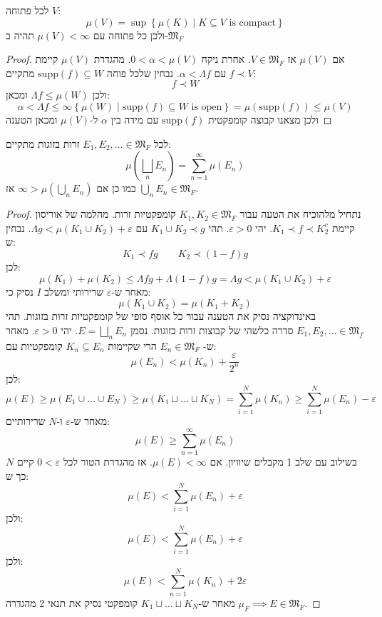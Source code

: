 \documentclass{tstextbook}
\begin{document}
\begin{lemma}[שלב 3]
לכל פתוחה \(V\):
$$\mu(V)=\sup \left\{  \mu(K) \mid K \subseteq V \text{ is compact}  \right\}$$
ולכן כל פתוחה עם \(\mu(V)< \infty\) תהיה ב-\(\mathfrak{M}_{F}\)

\end{lemma}
\begin{proof}
אם \(\mu(V)\) אז \(V \in \mathfrak{M}_{F}\). אחרת ניקח \(0<\alpha< \mu(V)\). מהגדרת \(\mu(V)\) קיימת \(f\prec V\) עם \(\alpha < \Lambda f\). נבחין שלכל פוחה \(\text{supp}(f)\subseteq W\) מתקיים:
$$f\prec W$$
ולכן \(\Lambda f\leq \mu(W)\) ומכאן:
$$\alpha< \Lambda f \leq \infty \left\{  \mu(W)\mid \text{supp}(f) \subseteq W \text{ is open}  \right\}=\mu\left( \text{supp}(f) \right)\leq \mu(V)$$
ולכן מצאנו קבוצה קומפקטית \(\text{supp}(f)\) עם מידה בין \(\alpha\) ל-\(\mu(V)\) ומכאן הטענה

\end{proof}
\begin{lemma}[שלב 4]
לכל \(E_{1}, E_{2}, \dots \in \mathfrak{M}_{F}\) זרות בזוגות מתקיים:
$$\mu\left( \bigsqcup_{n} E_{n} \right)=\sum_{n=1}^{\infty} \mu(E_{n})$$
כמו כן אם \(\infty> \mu\left( \bigcup_{n}E_{n} \right)\) אז \(\bigcup_{n}E_{n}\in \mathfrak{M}_{F}\).

\end{lemma}
\begin{proof}
נתחיל מלהוכיח את הטעה עבור \(K_{1},K_{2} \in \mathfrak{ M}_{F}\) קומפקטיות זרות. מהלמה של אוריסון קיימת \(K_{1}\prec f\prec K_{2}^{c}\). יהי \(\varepsilon> 0\). תהי \(K_{1}\cup K_{2}\prec g\) עם \(\Lambda g <\mu\left( K_{1}\cup K_{2} \right)+\varepsilon\). נבחין ש:
$$K_{1}\prec fg \qquad  K_{2}\prec (1-f)g$$
לכן:
$$\mu(K_{1})+\mu(K_{2})\leq \Lambda fg + \Lambda(1-f)g = \Lambda g <\mu\left( K_{1} \cup K_{2} \right)+\varepsilon$$
מאחר ש-\(\varepsilon\) שרירותי ומשלב \(I\) נסיק כי:
$$\mu\left( K_{1} \cup K_{2} \right)= \mu(K_{1}+K_{2})$$
באינדוקציה נסיק את הטענה עבור כל אוסף סופי של קומפקטיות זרות בזוגות. תהי \(E_{1},E_{2},\dots \in \mathfrak{M}_{f}\) סדרה כלשהי של קבוצות זרות בזוגות. נסמן \(E=\bigsqcup_{n} E_{n}\). יהי \(\varepsilon>0\). מאחר ש- \(E_{n} \in \mathfrak{M}_{F}\) הרי שקיימות \(K_{n}\subseteq E_{n}\) קומפקטיות עם:
$$\mu(E_{n})<\mu(K_{n})+\frac{\varepsilon}{2^{n}}$$
לכן:
$$\mu(E)\geq \mu\left( E_{1} \cup \dots \cup E_{N} \right)\geq \mu\left( K_{1} \sqcup \dots \sqcup K_{N} \right) = \sum_{i=1}^{N} \mu(K_{n})\geq \sum_{i=1}^{N} \mu(E_{n})-\varepsilon$$
מאחר ש-\(\varepsilon\) ו-\(N\) שרירותיים:
$$\mu(E)\geq \sum_{n=1}^{\infty} \mu(E_{n})$$
בשילוב עם שלב 1 מקבלים שיוויון. אם \(\mu(E)<\infty\). אז מהגדרת הטור לכל \(0<\varepsilon\) קיים \(N\) כך ש:
$$\mu(E)<\sum_{i=1}^{N} \mu(E_{n})+\varepsilon$$
ולכן:
$$\mu(E)< \sum_{i=1}^{N} \mu(E_{n})+\varepsilon$$
ולכן:
$$\mu(E)<\sum_{n=1}^{N} \mu(K_{n})+2\varepsilon$$
מאחר ש-\(K_{1}\sqcup \dots \sqcup K_{N}\) קומפקטי נסיק את תנאי 2 מהגדרה \(\mu_{F}\implies E \in \mathfrak{M}_{F}\).

\end{proof}
\end{document}
